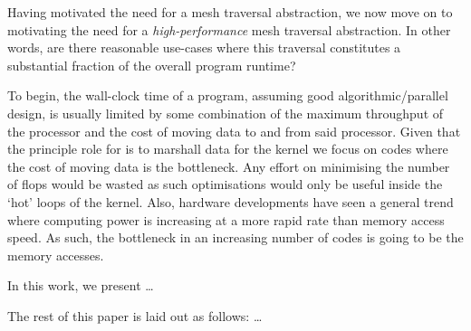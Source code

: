 Having motivated the need for a mesh traversal abstraction, we now move on to motivating the need for a \textit{high-performance} mesh traversal abstraction.
In other words, are there reasonable use-cases where this traversal constitutes a substantial fraction of the overall program runtime?

To begin, the wall-clock time of a program, assuming good algorithmic/parallel design, is usually limited by some combination of the maximum throughput of the processor and the cost of moving data to and from said processor.
Given that the principle role for \projectname is to marshall data for the kernel we focus on codes where the cost of moving data is the bottleneck.
Any effort on minimising the number of \gls{flops} would be wasted as such optimisations would only be useful inside the `hot' loops of the kernel.
Also, hardware developments have seen a general trend where computing power is increasing at a more rapid rate than memory access speed.
As such, the bottleneck in an increasing number of codes is going to be the memory accesses.

In this work, we present \projectname\dots



The rest of this paper is laid out as follows: \dots
